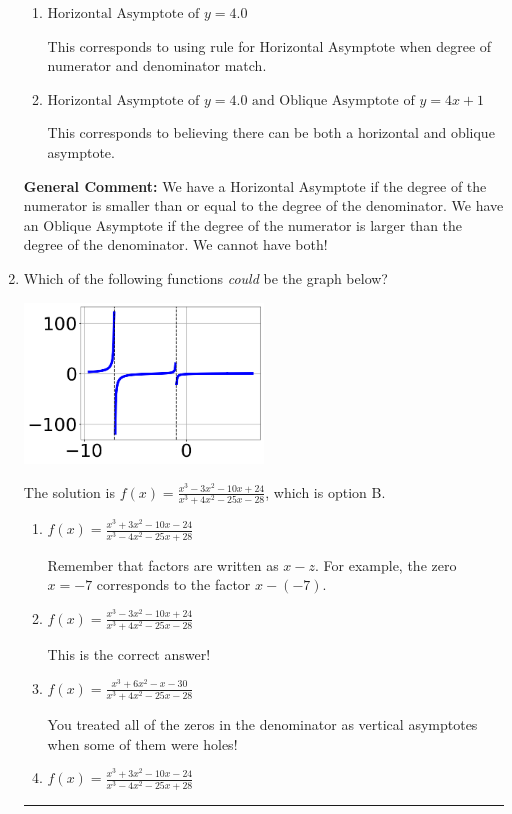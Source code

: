 \documentclass{extbook}[14pt]
\newcommand{\litem}[1]{\item #1

\rule{\textwidth}{0.4pt}}
\begin{document}
\begin{enumerate}
{\begin{enumerate}[label=\Alph*.]
This is the correct answer.
\item \( \text{Horizontal Asymptote of } y = 4.0  \)

This corresponds to using rule for Horizontal Asymptote when degree of numerator and denominator match.
\item \( \text{Horizontal Asymptote of } y = 4.0 \text{ and Oblique Asymptote of } y = 4x + 1 \)

This corresponds to believing there can be both a horizontal and oblique asymptote.
\end{enumerate}

\textbf{General Comment:} We have a Horizontal Asymptote if the degree of the numerator is smaller than or equal to the degree of the denominator. We have an Oblique Asymptote if the degree of the numerator is larger than the degree of the denominator. We cannot have both!
}
\litem{
Which of the following functions \textit{could} be the graph below?

\begin{center}
    \includegraphics[width=0.5\textwidth]{../Figures/identifyGraphOfRationalFunctionCopyB.png}
\end{center}


The solution is \( f(x)=\frac{x^{3} -3 x^{2} -10 x + 24}{x^{3} +4 x^{2} -25 x -28} \), which is option B.\begin{enumerate}[label=\Alph*.]
\item \( f(x)=\frac{x^{3} +3 x^{2} -10 x -24}{x^{3} -4 x^{2} -25 x + 28} \)

Remember that factors are written as $x-z$. For example, the zero $x=-7$ corresponds to the factor $x-(-7)$.
\item \( f(x)=\frac{x^{3} -3 x^{2} -10 x + 24}{x^{3} +4 x^{2} -25 x -28} \)

This is the correct answer!
\item \( f(x)=\frac{x^{3} +6 x^{2} -x -30}{x^{3} +4 x^{2} -25 x -28} \)

You treated all of the zeros in the denominator as vertical asymptotes when some of them were holes!
\item \( f(x)=\frac{x^{3} +3 x^{2} -10 x -24}{x^{3} -4 x^{2} -25 x + 28} \)


\end{enumerate}}
\end{enumerate}
\end{document}
